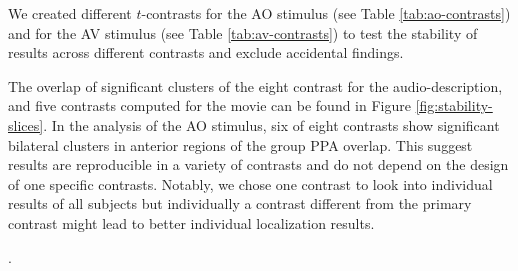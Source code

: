 \documentclass[english]{article}
\begin{document}


We created different $t$-contrasts for the AO stimulus (see Table
\ref{tab:ao-contrasts}) and for the AV stimulus (see Table
\ref{tab:av-contrasts}) to test the stability of results across different
contrasts and exclude accidental findings.


The overlap of significant clusters of the eight contrast for the
audio-description, and five contrasts computed for the movie can be found in
Figure \ref{fig:stability-slices}.
In the analysis of the AO stimulus, six of eight contrasts show significant
bilateral clusters in anterior regions of the group PPA
overlap.
This suggest results are reproducible in a variety of contrasts and do not
depend on the design of one specific contrasts.
Notably, we chose one contrast to look into individual results of all subjects
but individually a contrast different from the primary contrast might lead to
better individual localization results.

.

\end{document}
